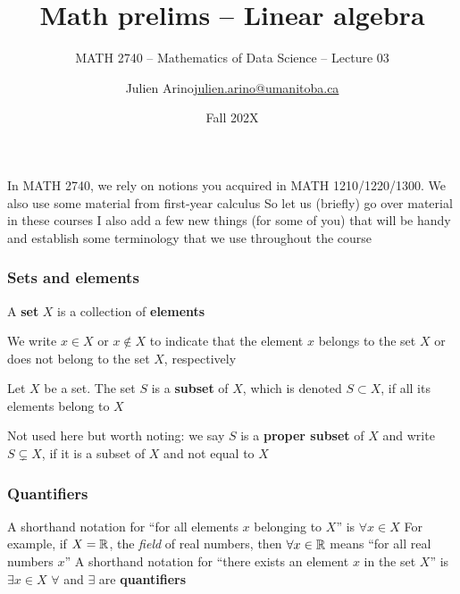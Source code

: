 \documentclass[aspectratio=169]{beamer}\usepackage[]{graphicx}\usepackage[]{xcolor}
\subtitle{MATH 2740 -- Mathematics of Data Science -- Lecture 03}
\author{\texorpdfstring{Julien Arino\newline\url{julien.arino@umanitoba.ca}}{Julien Arino}}
\institute{Department of Mathematics @ University of Manitoba}
\date{Fall 202X}
\title{Math prelims -- Linear algebra}
\begin{document}

\begin{frame}
In MATH 2740, we rely on notions you acquired in MATH 1210/1220/1300. We also use some material from first-year calculus
\vfill
So let us (briefly) go over material in these courses
\vfill
I also add a few new things (for some of you) that will be handy and establish some terminology that we use throughout the course
\end{frame}




\begin{frame}
\frametitle{Sets and elements}
	\begin{definition}[Set]
		A \textbf{set} $X$ is a collection of \textbf{elements}
	\end{definition}
	We write $x\in X$ or $x\not\in X$ to indicate that the element $x$ belongs to
	the set $X$ or does not belong to the set $X$, respectively
	\vfill
	\begin{definition}[Subset]
		Let $X$ be a set. The set $S$ is a \textbf{subset} of $X$, which is denoted
		$S\subset X$, if all its elements belong to $X$
	\end{definition}
Not used here but worth noting: we say $S$ is a \textbf{proper subset} of $X$ and write $S\subsetneq X$, if it is a subset of $X$ and not equal to $X$
\end{frame}


\begin{frame}
\frametitle{Quantifiers}
	A shorthand notation for ``for all elements $x$ belonging to $X$'' is $\forall x\in X$
	\vfill
	For example, if $X=\mathbb{R}$, the \emph{field} of real numbers, then $\forall x\in\mathbb{R}$ means ``for all real numbers $x$''
	\vfill
	A shorthand notation for ``there exists an element $x$ in the set $X$'' is
	$\exists x\in X$
	\vfill
	$\forall$ and $\exists$ are \textbf{quantifiers}
\end{frame}
\end{document}
